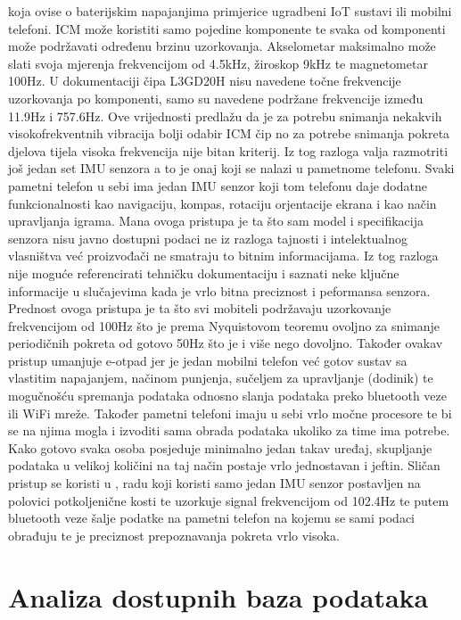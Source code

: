 \documentclass[times, utf8, diplomski]{fer}
\begin{document}
koja ovise o baterijskim napajanjima primjerice ugradbeni IoT sustavi ili mobilni telefoni. ICM može koristiti samo pojedine
komponente te svaka od komponenti može podržavati određenu brzinu uzorkovanja. Akselometar maksimalno može slati svoja mjerenja
frekvencijom od 4.5kHz, žiroskop 9kHz te magnetometar 100Hz. U dokumentaciji čipa L3GD20H nisu navedene točne frekvencije
uzorkovanja po komponenti, samo su navedene podržane frekvencije između 11.9Hz i 757.6Hz. Ove vrijednosti predlažu da je za
potrebu snimanja nekakvih visokofrekventnih vibracija bolji odabir ICM čip no za potrebe snimanja pokreta djelova tijela visoka
frekvencija nije bitan kriterij. Iz tog razloga valja razmotriti još jedan set IMU senzora a to je onaj koji se nalazi u pametnome
telefonu. Svaki pametni telefon u sebi ima jedan IMU senzor koji tom telefonu daje dodatne funkcionalnosti kao navigaciju, kompas,
rotaciju orjentacije ekrana i kao način upravljanja igrama. Mana ovoga pristupa je ta što sam model i specifikacija senzora
nisu javno dostupni podaci ne iz razloga tajnosti i intelektualnog vlasništva već proizvođači ne smatraju to bitnim informacijama.
Iz tog razloga nije moguće referencirati tehničku dokumentaciju i saznati neke ključne informacije u slučajevima kada je vrlo 
bitna preciznost i peformansa senzora. Prednost ovoga pristupa je ta što svi mobiteli podržavaju uzorkovanje frekvencijom od 
100Hz što je prema Nyquistovom teoremu ovoljno za snimanje periodičnih pokreta od gotovo 50Hz što je i više nego dovoljno.
Također ovakav pristup umanjuje e-otpad jer je jedan mobilni telefon već gotov sustav sa vlastitim napajanjem, načinom punjenja,
sučeljem za upravljanje (dodinik) te mogučnošću spremanja podataka odnosno slanja podataka preko bluetooth veze ili WiFi mreže.
Također pametni telefoni imaju u sebi vrlo močne procesore te bi se na njima mogla i izvoditi sama obrada podataka ukoliko za time
ima potrebe. Kako gotovo svaka osoba posjeduje minimalno jedan takav uređaj, skupljanje podataka u velikoj količini na taj način
postaje vrlo jednostavan i jeftin. Sličan pristup se koristi u \cite{android}, radu koji koristi samo jedan IMU senzor
postavljen na polovici potkoljenične kosti te uzorkuje signal frekvencijom od 102.4Hz te putem bluetooth veze šalje podatke na 
pametni telefon na kojemu se sami podaci obrađuju te je preciznost prepoznavanja pokreta vrlo visoka.

\section{Analiza dostupnih baza podataka}
\end{document}
